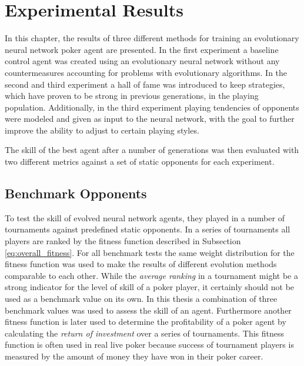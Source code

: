 

\chapter{Experimental Results}
\label{cha:results}

In this chapter, the results of three different methods for training an evolutionary neural network poker agent are presented. In the first experiment a baseline control agent was created using an evolutionary neural network without any countermeasures accounting for problems with evolutionary algorithms. In the second and third experiment a hall of fame was introduced to keep strategies, which have proven to be strong in previous generations, in the playing population. Additionally, in the third experiment playing tendencies of opponents were modeled and given as input to the neural network, with the goal to further improve the ability to adjust to certain playing styles. \par
The skill of the best agent after a number of generations was then evaluated with two different metrics against a set of static opponents for each experiment. 
\section{Benchmark Opponents}
To test the skill of evolved neural network agents, they played in a number of tournaments against predefined static opponents. In a series of tournaments all players are ranked by the fitness function described in Subsection \ref{eq:overall_fitness}. For all benchmark tests the same weight distribution for the fitness function was used to make the results of different evolution methods comparable to each other. While the \textit{average ranking} in a tournament might be a strong indicator for the level of skill of a poker player, it certainly should not be used as a benchmark value on its own. In this thesis a combination of three benchmark values was used to assess the skill of an agent. Furthermore another fitness function is later used to determine the profitability of a poker agent by calculating the \textit{return of investment} over a series of tournaments. This fitness function is often used in real live poker because success of tournament players is measured by the amount of money they have won in their poker career.

